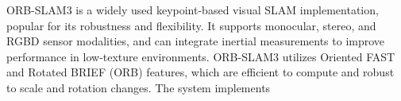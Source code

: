 
ORB-SLAM3 is a widely used keypoint-based visual SLAM implementation, popular for its robustness and flexibility. It supports monocular, stereo, and RGBD sensor modalities, and can integrate inertial measurements to improve performance in low-texture environments. ORB-SLAM3 utilizes Oriented FAST and Rotated BRIEF (ORB) features, which are efficient to compute and robust to scale and rotation changes. The system implements



